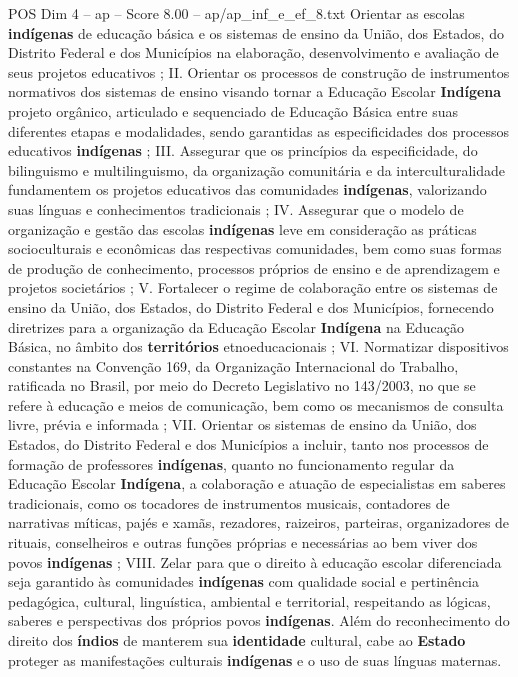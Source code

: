 \begin{textsample}{POS Dim 4 – ap – Score 8.00 – ap/ap\_inf\_e\_ef\_8.txt}
Orientar as escolas \textbf{indígenas} de educação básica e os sistemas de ensino da União, dos Estados, do Distrito Federal e dos Municípios na elaboração, desenvolvimento e avaliação de seus projetos educativos ; II.
Orientar os processos de construção de instrumentos normativos dos sistemas de ensino visando tornar a Educação Escolar \textbf{Indígena} projeto orgânico, articulado e sequenciado de Educação Básica entre suas diferentes etapas e modalidades, sendo garantidas as especificidades dos processos educativos \textbf{indígenas} ; III.
Assegurar que os princípios da especificidade, do bilinguismo e multilinguismo, da organização comunitária e da interculturalidade fundamentem os projetos educativos das comunidades \textbf{indígenas}, valorizando suas línguas e conhecimentos tradicionais ; IV.
Assegurar que o modelo de organização e gestão das escolas \textbf{indígenas} leve em consideração as práticas socioculturais e econômicas das respectivas comunidades, bem como suas formas de produção de conhecimento, processos próprios de ensino e de aprendizagem e projetos societários ; V.
Fortalecer o regime de colaboração entre os sistemas de ensino da União, dos Estados, do Distrito Federal e dos Municípios, fornecendo diretrizes para a organização da Educação Escolar \textbf{Indígena} na Educação Básica, no âmbito dos \textbf{territórios} etnoeducacionais ; VI.
Normatizar dispositivos constantes na Convenção 169, da Organização Internacional do Trabalho, ratificada no Brasil, por meio do Decreto Legislativo no 143/2003, no que se refere à educação e meios de comunicação, bem como os mecanismos de consulta livre, prévia e informada ; VII.
Orientar os sistemas de ensino da União, dos Estados, do Distrito Federal e dos Municípios a incluir, tanto nos processos de formação de professores \textbf{indígenas}, quanto no funcionamento regular da Educação Escolar \textbf{Indígena}, a colaboração e atuação de especialistas em saberes tradicionais, como os tocadores de instrumentos musicais, contadores de narrativas míticas, pajés e xamãs, rezadores, raizeiros, parteiras, organizadores de rituais, conselheiros e outras funções próprias e necessárias ao bem viver dos povos \textbf{indígenas} ; VIII.
Zelar para que o direito à educação escolar diferenciada seja garantido às comunidades \textbf{indígenas} com qualidade social e pertinência pedagógica, cultural, linguística, ambiental e territorial, respeitando as lógicas, saberes e perspectivas dos próprios povos \textbf{indígenas}.
Além do reconhecimento do direito dos \textbf{índios} de manterem sua \textbf{identidade} cultural, cabe ao \textbf{Estado} proteger as manifestações culturais \textbf{indígenas} e o uso de suas línguas maternas.

\end{textsample}
